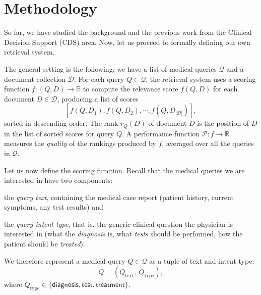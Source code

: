 \chapter{Methodology}\label{meth}

So far, we have studied the background and the previous work from the Clinical Decision Support (CDS) area.
Now, let us proceed to formally defining our own retrieval system.

The general setting is the following: we have a list of medical queries $\mathcal{Q}$ and a document collection $\mathcal{D}$.
For each query $Q \in \mathcal{Q}$,
the retrieval system uses a scoring function $f:(Q,D)\rightarrow\mathbb{R}$ to compute the relevance score $f(Q,D)$
for each
document $D\in\mathcal{D}$, producing a list of scores \[[f(Q,D_1), f(Q,D_2), \cdots, f(Q,D_{|\mathcal{D}|})],\]
sorted in descending order.
The rank $r_Q(D)$ of document $D$ is the position of $D$ in the list of sorted scores for query $Q$.
A performance function $\mathcal{P}:f\rightarrow\mathbb{R}$ measures the \emph{quality} of the rankings produced by
$f$, averaged over all the queries in $ \mathcal{Q}$.

Let us now define the scoring function.
Recall that the medical queries we are interested in have two components:
\begin{enumerate*}[label=\arabic*)]
 \item the \emph{query text}, containing the medical case report (patient history, current symptoms, any test results) and
 \item the \emph{query intent type}, that is, the generic clinical question the physician is interested in
 (what the \emph{diagnosis} is, what \emph{tests} should be performed, how the patient should be \emph{treated}).
\end{enumerate*}
We therefore represent a medical query $Q\in\mathcal{Q}$ as a tuple of text and intent type: \[Q = \left(Q_{\text{text}},\ Q_{\text{type}}\right),\]
where $Q_{\text{type}} \in \{\textsf{diagnosis}, \textsf{test}, \textsf{treatment}\}$.


